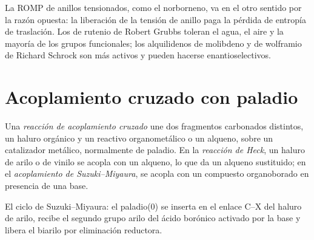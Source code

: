La ROMP de anillos tensionados, como el norborneno, va en el otro sentido por la razón
opuesta: la liberación de la tensión de anillo paga la pérdida de entropía de traslación.
Los  de rutenio de Robert Grubbs toleran el agua, el aire y la mayoría de los grupos
funcionales; los alquilidenos de molibdeno y de wolframio de Richard Schrock son más activos
y pueden hacerse enantioselectivos.

\section{Acoplamiento cruzado con paladio}

\begin{definition}\label{def:b3:homogeneous-catalysis:cross-coupling}
Una \emph{reacción de acoplamiento cruzado} une dos
fragmentos carbonados distintos, un haluro orgánico y un reactivo organometálico o un
alqueno, sobre un catalizador metálico, normalmente de paladio. En la \emph{reacción de
Heck}, un haluro de arilo o de vinilo se acopla con un alqueno,
lo que da un alqueno sustituido; en el \emph{acoplamiento de
Suzuki--Miyaura}, se acopla con un compuesto
organoborado en presencia de una base.
\end{definition}

\begin{omfigure}

{\small El ciclo de Suzuki--Miyaura: el paladio(0) se inserta en el enlace C--X del
haluro de arilo, recibe el segundo grupo arilo del ácido borónico activado por
la base y libera el biarilo por eliminación reductora.}
\end{omfigure}

